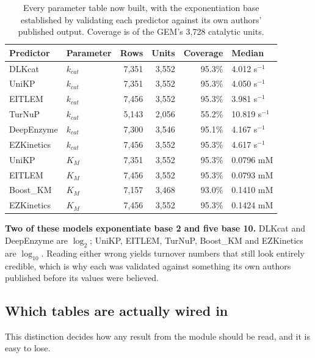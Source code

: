 \begin{table}[H]
  \centering
  \footnotesize
  \caption[The built tables]{Every parameter table now built, with the exponentiation base
  established by validating each predictor against its own authors' published output.
  Coverage is of the GEM's 3{,}728 catalytic units.}
  \label{tab:tables}
  \begin{tabular}{@{}llrrrl@{}}
    \hline
    Predictor & Parameter & Rows & Units & Coverage & Median \\
    \hline
    DLKcat & $k_{cat}$ & 7{,}351 & 3{,}552 & 95.3\% & 4.012 s$^{-1}$ \\
    UniKP & $k_{cat}$ & 7{,}351 & 3{,}552 & 95.3\% & 4.050 s$^{-1}$ \\
    EITLEM & $k_{cat}$ & 7{,}456 & 3{,}552 & 95.3\% & 3.981 s$^{-1}$ \\
    TurNuP & $k_{cat}$ & 5{,}143 & 2{,}056 & 55.2\% & 10.819 s$^{-1}$ \\
    DeepEnzyme & $k_{cat}$ & 7{,}300 & 3{,}546 & 95.1\% & 4.167 s$^{-1}$ \\
    EZKinetics & $k_{cat}$ & 7{,}456 & 3{,}552 & 95.3\% & 4.617 s$^{-1}$ \\
    \hline
    UniKP & $K_M$ & 7{,}351 & 3{,}552 & 95.3\% & 0.0796 mM \\
    EITLEM & $K_M$ & 7{,}456 & 3{,}552 & 95.3\% & 0.0793 mM \\
    Boost\_KM & $K_M$ & 7{,}157 & 3{,}468 & 93.0\% & 0.1410 mM \\
    EZKinetics & $K_M$ & 7{,}456 & 3{,}552 & 95.3\% & 0.1424 mM \\
    \hline
  \end{tabular}
\end{table}

\textbf{Two of these models exponentiate base 2 and five base 10.} DLKcat and DeepEnzyme
are $\log_2$; UniKP, EITLEM, TurNuP, Boost\_KM and EZKinetics are $\log_{10}$. Reading either wrong
yields turnover numbers that still look entirely credible, which is why each was validated
against something its own authors published before its values were believed.

\subsection{Which tables are actually wired in}

This distinction decides how any result from the module should be read, and it is easy to
lose.

